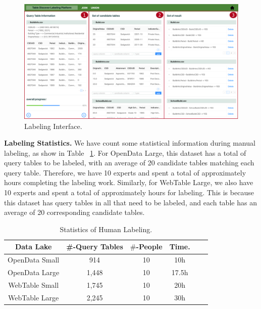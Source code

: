 \begin{figure}[h]
	\centering
	\includegraphics[width=1.0\linewidth]{fig/interface.pdf}
	\caption{Labeling Interface.}
	\label{fig:interface}
\end{figure}

\noindent \textbf{Labeling Statistics.} 
We have count some statistical information during manual labeling, as show in Table ~\ref{Table:humanLabeling}. For OpenData Large, this dataset has a total of   query tables to be labeled, with an average of 20 candidate tables matching each query table. Therefore, we have 10 experts and spent a total of approximately  hours completing the labeling work. Similarly, for WebTable Large, we also have 10 experts and spent a total of approximately  hours for labeling. This is because this dataset has  query tables in all that need to be labeled, and each table has an average of 20 corresponding candidate tables.

\begin{table}[t]
	\centering
	\caption{Statistics of Human Labeling.}
	\begin{tabular}{|c|c|c|c|c|c|}
		\hline
		\centering
		Data Lake  & \#-Query Tables & $\#$-People & Time.   \\
		\hline  
		OpenData Small& 914  & 10 & 10h   \\
		\hline
		OpenData Large& 1,448  & 10  &  17.5h   \\
		\hline
		WebTable Small& 1,745   & 10 &  20h  \\
		\hline
		WebTable Large& 2,245  & 10 &  30h  \\
		\hline
	\end{tabular}
	\label{Table:humanLabeling}
	
\end{table}
